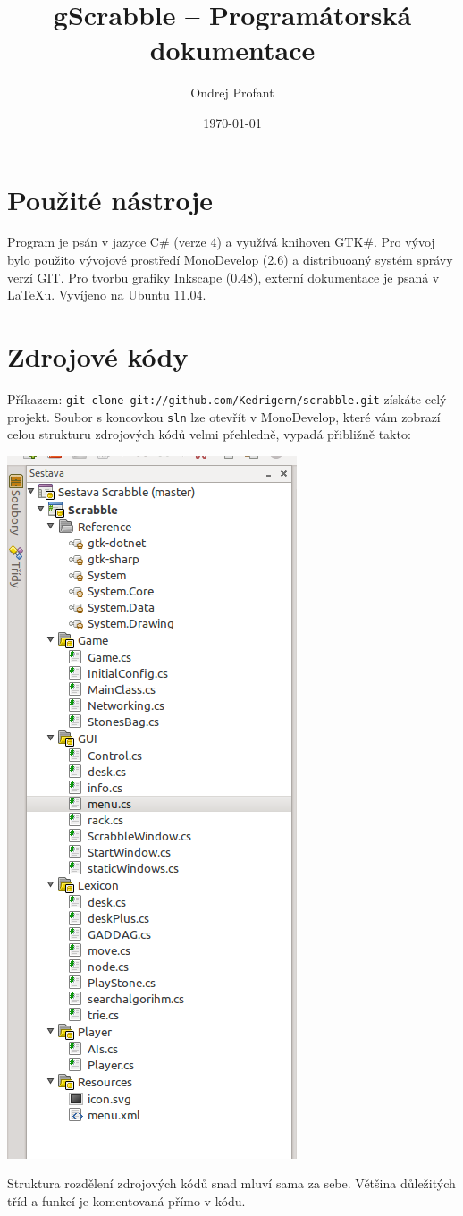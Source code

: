 \documentclass[a4paper]{article}
\title{gScrabble -- Programátorská dokumentace}
\author{Ondrej Profant}
\date{\today}
\begin{document}
\tableofcontents	

\section{Použité nástroje}
Program je psán v jazyce C\# (verze 4) a využívá knihoven GTK\#. 
Pro vývoj bylo použito vývojové prostředí MonoDevelop (2.6) a distribuoaný systém správy verzí GIT.
Pro tvorbu grafiky Inkscape (0.48), externí dokumentace je psaná v LaTeXu. Vyvíjeno na Ubuntu 11.04.

\section{Zdrojové kódy}
Příkazem: \texttt{git clone git://github.com/Kedrigern/scrabble.git} získáte celý projekt. 
Soubor s koncovkou \texttt{sln} lze otevřít v MonoDevelop, které vám zobrazí celou strukturu zdrojových kódů velmi přehledně, vypadá přibližně takto:

\includegraphics[scale=0.5]{pic/monodevelop-project.png}

Struktura rozdělení zdrojových kódů snad mluví sama za sebe. Většina důležitých tříd a funkcí je komentovaná přímo v kódu. 
\end{document}
